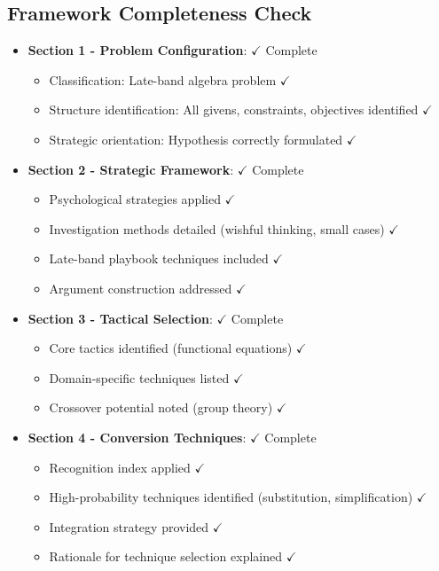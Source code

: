 \documentclass[11pt]{article}
\begin{document}
\subsection*{Framework Completeness Check}
\begin{itemize}[leftmargin=*]
    \item \textbf{Section 1 - Problem Configuration}: $\checkmark$ Complete
    \begin{itemize}
        \item Classification: Late-band algebra problem $\checkmark$
        \item Structure identification: All givens, constraints, objectives identified $\checkmark$
        \item Strategic orientation: Hypothesis correctly formulated $\checkmark$
    \end{itemize}
    
    \item \textbf{Section 2 - Strategic Framework}: $\checkmark$ Complete
    \begin{itemize}
        \item Psychological strategies applied $\checkmark$
        \item Investigation methods detailed (wishful thinking, small cases) $\checkmark$
        \item Late-band playbook techniques included $\checkmark$
        \item Argument construction addressed $\checkmark$
    \end{itemize}
    
    \item \textbf{Section 3 - Tactical Selection}: $\checkmark$ Complete
    \begin{itemize}
        \item Core tactics identified (functional equations) $\checkmark$
        \item Domain-specific techniques listed $\checkmark$
        \item Crossover potential noted (group theory) $\checkmark$
    \end{itemize}
    
    \item \textbf{Section 4 - Conversion Techniques}: $\checkmark$ Complete
    \begin{itemize}
        \item Recognition index applied $\checkmark$
        \item High-probability techniques identified (substitution, simplification) $\checkmark$
        \item Integration strategy provided $\checkmark$
        \item Rationale for technique selection explained $\checkmark$
    \end{itemize}
    

\end{itemize}
\end{document}
